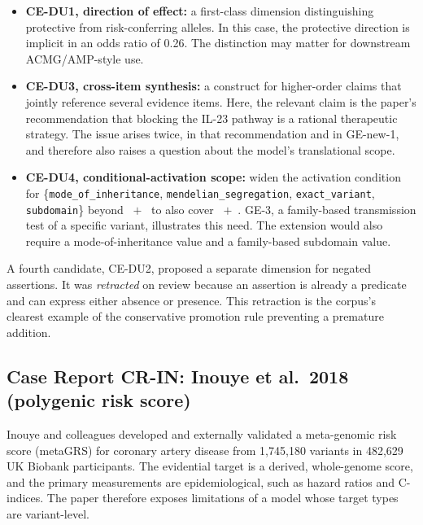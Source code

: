 \begin{itemize}
  \item \textbf{CE-DU1, direction of effect:} a first-class dimension
  distinguishing protective from risk-conferring alleles. In this case, the
  protective direction is implicit in an odds ratio of 0.26. The distinction
  may matter for downstream ACMG/AMP-style use.
  \item \textbf{CE-DU3, cross-item synthesis:} a construct for
    higher-order claims that jointly reference several evidence items. Here,
    the relevant claim is the paper's recommendation that blocking the IL-23
    pathway is a rational therapeutic strategy. The issue arises twice, in
    that recommendation and in GE-new-1, and therefore also raises a question
    about the model's translational scope.
  \item \textbf{CE-DU4, conditional-activation scope:} widen the
    activation condition for
    \{\texttt{mode\_of\_\allowbreak inheritance},
    \texttt{mendelian\_\allowbreak segregation}, \texttt{exact\_variant},
    \texttt{subdomain}\} beyond
    ~$+$~ to also cover
    ~$+$~. GE-3, a family-based
    transmission test of a specific variant, illustrates this need. The
    extension would also require a  mode-of-inheritance
    value and a family-based subdomain value.
\end{itemize}
A fourth candidate, CE-DU2, proposed a separate dimension for negated
assertions. It was \emph{retracted} on review because an assertion is already
a predicate and can express either absence or presence. This retraction is
the corpus's clearest example of the conservative promotion rule preventing
a premature addition.

\subsection{Case Report CR-IN: Inouye et al.\ 2018 (polygenic risk score)}
\label{sec:supp-ex-inouye}

Inouye and colleagues developed and externally validated a meta-genomic risk
score (metaGRS) for coronary artery disease from 1{,}745{,}180 variants in
482{,}629 UK Biobank participants. The evidential target is a derived,
whole-genome score, and the primary measurements are epidemiological, such
as hazard ratios and C-indices. The paper therefore exposes limitations of
a model whose target types are variant-level.

